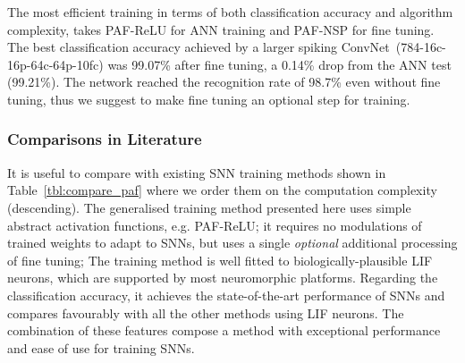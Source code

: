 	
	The most efficient training in terms of both classification accuracy and algorithm complexity, takes PAF-ReLU for ANN training and PAF-NSP for fine tuning.
	The best classification accuracy achieved by a larger spiking ConvNet~(784-16c-16p-64c-64p-10fc) was 99.07\% after fine tuning, a 0.14\% drop from the ANN test (99.21\%).
	The network reached the recognition rate of 98.7\% even without fine tuning, thus we suggest to make fine tuning an optional step for training.

	\subsubsection{Comparisons in Literature}
	It is useful to compare with existing SNN training methods shown in Table~\ref{tbl:compare_paf} where we order them on the computation complexity (descending).
	The generalised training method presented here uses simple abstract activation functions, e.g. PAF-ReLU;
	it requires no modulations of trained weights to adapt to SNNs, but uses a single \emph{optional} additional processing of fine tuning;
	The training method is well fitted to biologically-plausible LIF neurons, which are supported by most neuromorphic platforms.
	Regarding the classification accuracy, it achieves the state-of-the-art performance of SNNs and compares favourably with all the other methods using LIF neurons.
	The combination of these features compose a method with exceptional performance and ease of use for training SNNs.

